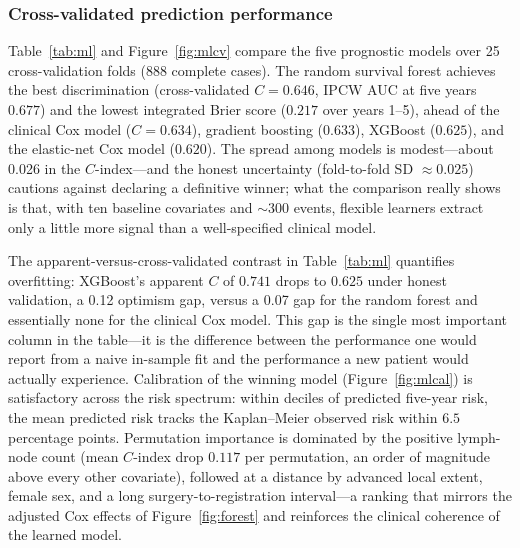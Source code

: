 \subsubsection*{Cross-validated prediction performance}

Table~\ref{tab:ml} and Figure~\ref{fig:mlcv} compare the five prognostic
models over 25 cross-validation folds (888 complete cases). The random
survival forest achieves the best discrimination (cross-validated
$C = 0.646$, IPCW AUC at five years $0.677$) and the lowest integrated
Brier score ($0.217$ over years 1--5), ahead of the clinical Cox model
($C = 0.634$), gradient boosting ($0.633$), XGBoost ($0.625$), and the
elastic-net Cox model ($0.620$). The spread among models is
modest---about 0.026 in the $C$-index---and the honest uncertainty
(fold-to-fold SD $\approx 0.025$) cautions against declaring a
definitive winner; what the comparison really shows is that, with ten
baseline covariates and $\sim$300 events, flexible learners extract only
a little more signal than a well-specified clinical model.

The apparent-versus-cross-validated contrast in Table~\ref{tab:ml}
quantifies overfitting: XGBoost's apparent $C$ of $0.741$ drops to
$0.625$ under honest validation, a 0.12 optimism gap, versus a 0.07 gap
for the random forest and essentially none for the clinical Cox model.
This gap is the single most important column in the table---it is the
difference between the performance one would report from a naive
in-sample fit and the performance a new patient would actually
experience. Calibration of the winning model
(Figure~\ref{fig:mlcal}) is satisfactory across the risk spectrum:
within deciles of predicted five-year risk, the mean predicted risk
tracks the Kaplan--Meier observed risk within $6.5$ percentage points.
Permutation importance is dominated by the positive lymph-node count
(mean $C$-index drop $0.117$ per permutation, an order of magnitude
above every other covariate), followed at a distance by advanced local
extent, female sex, and a long surgery-to-registration interval---a
ranking that mirrors the adjusted Cox effects of Figure~\ref{fig:forest}
and reinforces the clinical coherence of the learned model.

